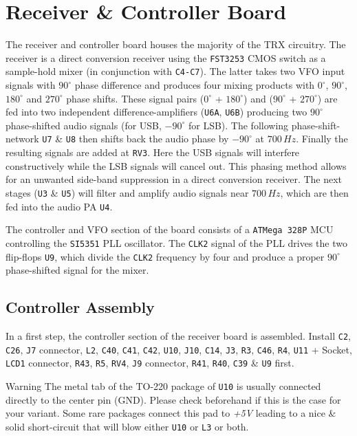 \documentclass[10pt, a4paper,twoside]{scrartcl}
\newenvironment{warning}{\begin{bclogo}[couleur=red!30,arrondi=.1,logo=\bcattention,ombre=true]{Warning}}{\end{bclogo}}
\begin{document}
\section{Receiver \& Controller Board} \label{sec:rx}
 The receiver and controller board houses the majority of the TRX circuitry. The receiver is a direct conversion receiver using the \texttt{FST3253} CMOS switch as a sample-hold mixer (in conjunction with \texttt{C4-C7}). The latter takes two VFO input signals with $90^\circ$ phase difference and produces four mixing products with $0^\circ$, $90^\circ$, $180^\circ$ and $270^\circ$ phase shifts. These signal pairs ($0^\circ$ + $180^\circ$) and ($90^\circ$ + $270^\circ$) are fed into two independent difference-amplifiers (\texttt{U6A}, \texttt{U6B}) producing two $90^\circ$ phase-shifted audio signals (for USB, $-90^\circ$ for LSB). The following phase-shift-network \texttt{U7} \& \texttt{U8} then shifts back the audio phase by $-90^\circ$ at $700\,Hz$. Finally the resulting signals are added at \texttt{RV3}. Here the USB signals will interfere constructively while the LSB signals will cancel out. This phasing method allows for an unwanted side-band suppression in a direct conversion receiver. The next stages (\texttt{U3} \& \texttt{U5}) will filter and amplify audio signals near $700\,Hz$, which are then fed into the audio PA \texttt{U4}. 
 
 The controller and VFO section of the board consists of a \texttt{ATMega 328P} MCU controlling the \texttt{SI5351} PLL oscillator. The \texttt{CLK2} signal of the PLL drives the two flip-flops \texttt{U9}, which divide the \texttt{CLK2} frequency by four and produce a proper $90^\circ$ phase-shifted signal for the mixer.
 
\subsection{Controller Assembly}
 In a first step, the controller section of the receiver board is assembled. Install \texttt{C2}, \texttt{C26}, \texttt{J7} connector, \texttt{L2}, \texttt{C40}, \texttt{C41}, \texttt{C42}, \texttt{U10}, \texttt{J10}, \texttt{C14}, \texttt{J3}, \texttt{R3}, \texttt{C46}, \texttt{R4}, \texttt{U11} + Socket, \texttt{LCD1} connector, \texttt{R43}, \texttt{R5}, \texttt{RV4}, \texttt{J9} connector, \texttt{R41}, \texttt{R40}, \texttt{C39} \& \texttt{U9} first. 

\begin{warning}
The metal tab of the TO-220 package of \texttt{U10} is usually connected directly to the center pin (GND). Please check beforehand if this is the case for your variant. Some rare packages connect this pad to \emph{+5V} leading to a nice \& solid short-circuit that will blow either \texttt{U10} or \texttt{L3} or both.
\end{warning}
\end{document}
